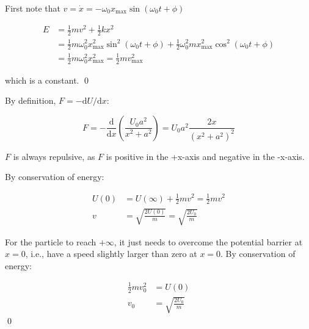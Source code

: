 \documentclass[12pt]{article}
\begin{document}
First note that $v = \dot{x} = -\omega_{0} x_{\text{max}} \sin{(\omega_{0}t + \phi)} $

\begin{equation}
\begin{split}
    E &= \frac{1}{2} m v^{2} + \frac{1}{2} k x^{2} \\
      &= \frac{1}{2} m \omega_{0}^{2} x_{\text{max}}^{2} \sin^{2}{(\omega_{0}t + \phi)} + \frac{1}{2} \omega_{0}^{2} m x_{\text{max}}^{2} \cos^{2}{(\omega_{0}t + \phi)} \\
      &= \frac{1}{2} m \omega_{0}^{2} x_{\text{max}}^{2} = \frac{1}{2} m v_{\text{max}}^{2}
\end{split}
\end{equation}

which is a constant.
\qed



By definition, $F = -\mathrm{d}U/\mathrm{d}x$:

\begin{equation}
    F = -\frac{\mathrm{d}}{\mathrm{d}x} \left( \frac{U_{0} a^{2}}{x^{2} + a^{2}} \right) = U_{0} a^{2} \frac{2x}{(x^{2} + a^{2})^{2}}
\end{equation}

$F$ is always repulsive, as $F$ is positive in the +x-axis and negative in the -x-axis.

By conservation of energy:

\begin{equation}
\begin{split}
    U(0) &= U(\infty) + \frac{1}{2} m v^{2} = \frac{1}{2} m v^{2} \\
    v &= \sqrt{\frac{2U(0)}{m}} = \sqrt{\frac{2U_{0}}{m}}
\end{split}
\end{equation}

For the particle to reach $+\infty$, it just needs to overcome the potential barrier at $x = 0$, i.e., have a speed slightly larger than zero at $x = 0$. By conservation of energy:

\begin{equation}
\begin{split}
    \frac{1}{2} m v_{0}^{2} &= U(0) \\
    v_{0} &= \sqrt{\frac{2U_{0}}{m}}
\end{split}
\end{equation}
\qed
\end{document}
